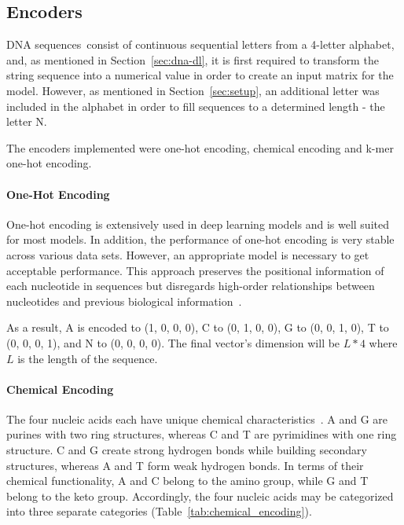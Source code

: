 \subsection{Encoders}

\gls{DNA} sequences consist of continuous sequential letters from a 4-letter alphabet, and, as mentioned in Section~\ref{sec:dna-dl}, it is first required to transform the string sequence into a numerical value in order to create an input matrix for the model. However, as mentioned in Section~\ref{sec:setup}, an additional letter was included in the alphabet in order to fill sequences to a determined length - the letter N.

The encoders implemented were one-hot encoding, chemical encoding and k-mer one-hot encoding.

\paragraph{One-Hot Encoding}

One-hot encoding is extensively used in deep learning models and is well suited for most models. In addition, the performance of one-hot encoding is very stable across various data sets. However, an appropriate model is necessary to get acceptable performance. This approach preserves the positional information of each nucleotide in sequences but disregards high-order relationships between nucleotides and previous biological information~\cite{Zhang2019ModelingNetwork}.

As a result, \gls{A} is encoded to (1, 0, 0, 0), \gls{C} to (0, 1, 0, 0), \gls{G} to (0, 0, 1, 0), \gls{T} to (0, 0, 0, 1), and N to (0, 0, 0, 0). The final vector's dimension will be $L * 4$ where $L$ is the length of the sequence.

\paragraph{Chemical Encoding}

The four nucleic acids each have unique chemical characteristics~\cite{GolamBari2013DNASequence}. \gls{A} and \gls{G} are purines with two ring structures, whereas \gls{C} and \gls{T} are pyrimidines with one ring structure. \gls{C} and \gls{G} create strong hydrogen bonds while building secondary structures, whereas \gls{A} and \gls{T} form weak hydrogen bonds. In terms of their chemical functionality, \gls{A} and \gls{C} belong to the amino group, while \gls{G} and \gls{T} belong to the keto group. Accordingly, the four nucleic acids may be categorized into three separate categories (Table~\ref{tab:chemical_encoding}).

